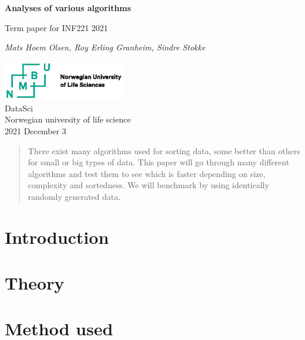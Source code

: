 \documentclass[a4paper,twocolumn]{article}
\begin{document}
\begin{titlepage}
	\begin{center}
		\vspace*{1cm}
		\Huge
		\textbf{Analyses of various algorithms}\\

		\vspace{0.5cm}
		\LARGE

		Term paper for INF221 2021\\

		\vspace{1.5cm}

		\textit{Mats Hoem Olsen, Roy Erling Granheim, Sindre Stokke}\\

		\vfill

		\includegraphics[width=0.4\textwidth]{./tex/pic/logo.eps}\\
		
		\LARGE
		DataSci\\
		Norwegian university of life science\\
		2021 December 3
	\end{center}		
\end{titlepage}

\tableofcontents
\begin{abstract}
There exist many algorithms used for sorting data, some better than others for small or big types of data. This paper will go through many different algorithms and test them to see which is faster depending on size, complexity and sortedness. We will benchmark by using identically randomly generated data.
\end{abstract}
\newpage

\section{Introduction}


\section{Theory}\label{sec:theory}



\section{Method used}
\end{document}
